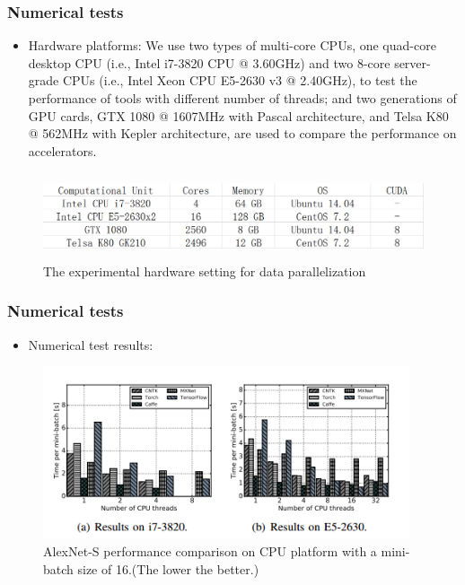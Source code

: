 \begin{frame}
	\MyLogo
	\frametitle{Numerical tests}  
	\begin{itemize}
		\item Hardware platforms: We use two types of multi-core
		CPUs, one quad-core desktop CPU (i.e., Intel i7-3820 CPU
		@ 3.60GHz) and two 8-core server-grade CPUs (i.e., Intel
		Xeon CPU E5-2630 v3 @ 2.40GHz), to test the performance of tools with different number of threads; and two
		generations of GPU cards, GTX 1080 @ 1607MHz with
		Pascal architecture, and Telsa K80 @ 562MHz with Kepler
		architecture, are used to compare the performance on accelerators. 
	\end{itemize}
	
	\begin{figure}[htbp] 
		\includegraphics[height=1in]{figures/platforms.png} 
		\caption{The experimental hardware setting for data parallelization}
	\end{figure}
	
\end{frame}

%

\begin{frame}
	\MyLogo
	\frametitle{Numerical tests}  
	\begin{itemize}
		\item Numerical test results:
	\end{itemize}
	\begin{figure}[htbp] 
		\includegraphics[height=2.0in]{figures/AlexNet-S1.png} 
		\caption{AlexNet-S performance comparison on CPU platform with a mini-batch size of 16.(The lower the better.)}
	\end{figure}	
\end{frame}


